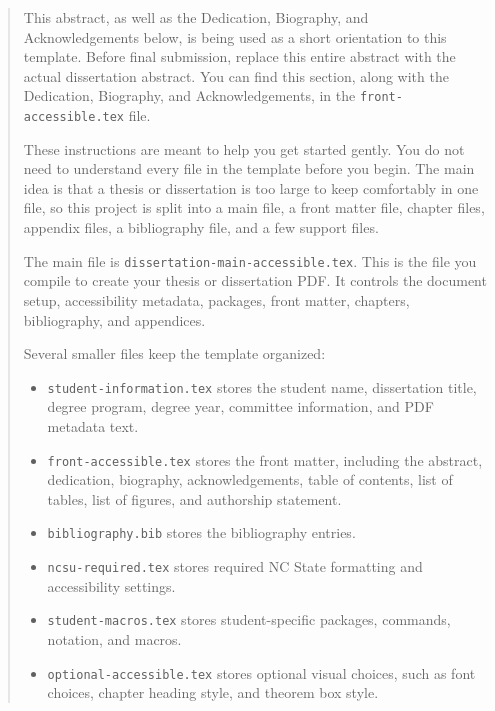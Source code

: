 \begin{abstract}

This abstract, as well as the Dedication, Biography, and Acknowledgements below, is being used as a short orientation to this template. Before final submission, replace this entire abstract with the actual dissertation abstract. You can find this section, along with the Dedication, Biography, and Acknowledgements, in the \texttt{front-accessible.tex} file.

These instructions are meant to help you get started gently. You do not need to understand every file in the template before you begin. The main idea is that a thesis or dissertation is too large to keep comfortably in one file, so this project is split into a main file, a front matter file, chapter files, appendix files, a bibliography file, and a few support files.

The main file is \texttt{dissertation-main-accessible.tex}. This is the file you compile to create your thesis or dissertation PDF. It controls the document setup, accessibility metadata, packages, front matter, chapters, bibliography, and appendices.

Several smaller files keep the template organized:

\begin{itemize}
  \item \texttt{student-information.tex} stores the student name, dissertation title, degree program, degree year, committee information, and PDF metadata text.

  \item \texttt{front-accessible.tex} stores the front matter, including the abstract, dedication, biography, acknowledgements, table of contents, list of tables, list of figures, and authorship statement.

  \item \texttt{bibliography.bib} stores the bibliography entries.

  \item \texttt{ncsu-required.tex} stores required NC State formatting and accessibility settings.

  \item \texttt{student-macros.tex} stores student-specific packages, commands, notation, and macros.

  \item \texttt{optional-accessible.tex} stores optional visual choices, such as font choices, chapter heading style, and theorem box style.
\end{itemize}


\end{abstract}
